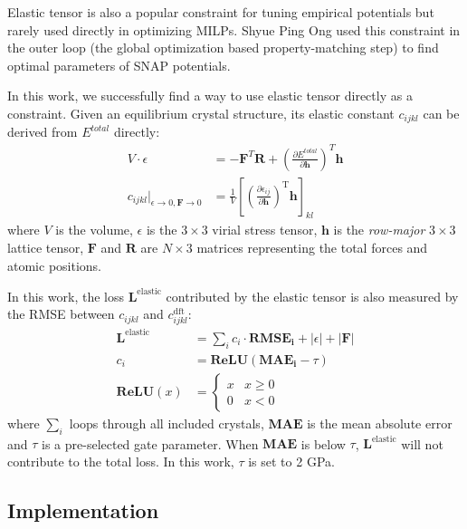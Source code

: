 \documentclass[prb,reprint]{revtex4-2}
\begin{document}
Elastic tensor is also a popular constraint for tuning empirical potentials but 
rarely used directly in optimizing MILPs. Shyue Ping Ong used this constraint in 
the outer loop (the global optimization based property-matching step) to find 
optimal parameters of SNAP potentials. 

In this work, we successfully find a way to use elastic tensor directly as a 
constraint. Given an equilibrium crystal structure, its elastic constant 
$c_{ijkl}$ can be derived from $E^{total}$ directly:
\begin{align}
\label{eq:virial}
V \cdot \epsilon & = -\mathbf{F}^{T}\mathbf{R} + \left(
    \frac{\partial E^{total}}{\partial \mathbf{h}}\right)^T \mathbf{h} \\ 
\label{eq:cijkl}
c_{ijkl} |_{\epsilon \to 0, \mathbf{F} \to 0} & = \frac{1}{V}\left[
    \left( 
        \frac{\partial{\epsilon_{ij}}}{\partial{\mathbf{h}}}
    \right)^{\mathrm{T}}\mathbf{h}
\right]_{kl}
\end{align}
where $V$ is the volume, $\epsilon$ is the $3 \times 3$ virial stress tensor, 
$\mathbf{h}$ is the \textit{row-major} $3 \times 3$ lattice tensor, $\mathbf{F}$ 
and $\mathbf{R}$ are $N \times 3$ matrices representing the total forces and 
atomic positions.

In this work, the loss $\mathbf{L}^{\mathrm{elastic}}$ contributed by the 
elastic tensor is also measured by the RMSE between $c_{ijkl}$ and 
$c_{ijkl}^{\mathrm{dft}}$:
\begin{align}
\label{eq:cijkl_loss}
\mathbf{L}^{\mathrm{elastic}} 
& = \sum_{i}{c_{i} \cdot \mathbf{RMSE_{i}} + {|\epsilon|} + {|\mathbf{F}|}} \\
\label{eq:cijkl_loss_gate}
c_{i} & = \mathbf{ReLU}(\mathbf{MAE_{i}} - \tau) \\
\label{eq:relu}
\mathbf{ReLU}(x) & = \begin{cases}
    x & x \ge 0 \\
    0 & x < 0
\end{cases}
\end{align}
where $\sum_{i}$ loops through all included crystals, $\mathbf{MAE}$ is the mean 
absolute error and $\tau$ is a pre-selected gate parameter. When $\mathbf{MAE}$ 
is below $\tau$, $\mathbf{L}^{\mathrm{elastic}}$ will not contribute to the 
total loss. In this work, $\tau$ is set to 2 GPa.

\subsection{Implementation}
\label{sec:implementation}
\end{document}

